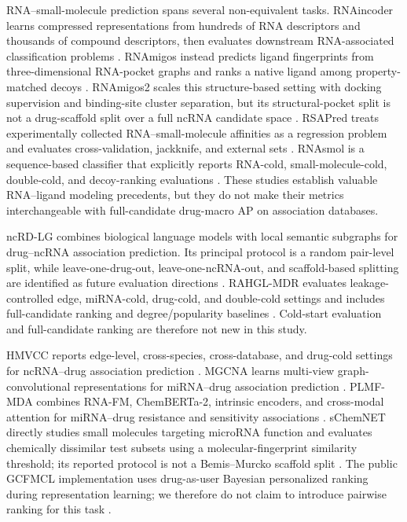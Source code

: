 \documentclass[10pt]{article}
\begin{document}
RNA--small-molecule prediction spans several non-equivalent tasks. RNAincoder learns compressed representations from hundreds of RNA descriptors and thousands of compound descriptors, then evaluates downstream RNA-associated classification problems \citep{wang2023rnaincoder}. RNAmigos instead predicts ligand fingerprints from three-dimensional RNA-pocket graphs and ranks a native ligand among property-matched decoys \citep{oliver2020rnamigos}. RNAmigos2 scales this structure-based setting with docking supervision and binding-site cluster separation, but its structural-pocket split is not a drug-scaffold split over a full ncRNA candidate space \citep{carvajalpatino2025rnamigos2}. RSAPred treats experimentally collected RNA--small-molecule affinities as a regression problem and evaluates cross-validation, jackknife, and external sets \citep{krishnan2024rsapred}. RNAsmol is a sequence-based classifier that explicitly reports RNA-cold, small-molecule-cold, double-cold, and decoy-ranking evaluations \citep{ma2025rnasmol}. These studies establish valuable RNA--ligand modeling precedents, but they do not make their metrics interchangeable with full-candidate drug-macro AP on association databases.

ncRD-LG combines biological language models with local semantic subgraphs for drug--ncRNA association prediction. Its principal protocol is a random pair-level split, while leave-one-drug-out, leave-one-ncRNA-out, and scaffold-based splitting are identified as future evaluation directions \citep{xie2026ncrdlg}. RAHGL-MDR evaluates leakage-controlled edge, miRNA-cold, drug-cold, and double-cold settings and includes full-candidate ranking and degree/popularity baselines \citep{elbashir2026rahgl}. Cold-start evaluation and full-candidate ranking are therefore not new in this study.

HMVCC reports edge-level, cross-species, cross-database, and drug-cold settings for ncRNA--drug association prediction \citep{ma2027hmvcc}. MGCNA learns multi-view graph-convolutional representations for miRNA--drug association prediction \citep{sheng2025mgcna}. PLMF-MDA combines RNA-FM, ChemBERTa-2, intrinsic encoders, and cross-modal attention for miRNA--drug resistance and sensitivity associations \citep{sheng2026plmf}. sChemNET directly studies small molecules targeting microRNA function and evaluates chemically dissimilar test subsets using a molecular-fingerprint similarity threshold; its reported protocol is not a Bemis--Murcko scaffold split \citep{galeano2024schemnet}. The public GCFMCL implementation uses drug-as-user Bayesian personalized ranking during representation learning; we therefore do not claim to introduce pairwise ranking for this task \citep{wei2023gcfmcl}.
\end{document}

